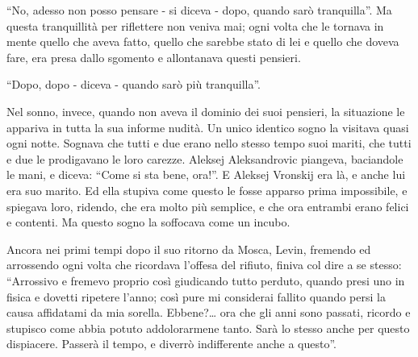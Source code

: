 ``No, adesso non posso pensare - si diceva - dopo, quando sarò tranquilla''. Ma questa tranquillità per riflettere non veniva mai; ogni volta che le tornava in mente quello che aveva fatto, quello che sarebbe stato di lei e quello che doveva fare, era presa dallo sgomento e allontanava questi pensieri. 

``Dopo, dopo - diceva - quando sarò più tranquilla''. 

Nel sonno, invece, quando non aveva il dominio dei suoi pensieri, la situazione le appariva in tutta la sua informe nudità. Un unico identico sogno la visitava quasi ogni notte. Sognava che tutti e due erano nello stesso tempo suoi mariti, che tutti e due le prodigavano le loro carezze. Aleksej Aleksandrovic piangeva, baciandole le mani, e diceva: ``Come si sta bene, ora!''. E Aleksej Vronskij era là, e anche lui era suo marito. Ed ella stupiva come questo le fosse apparso prima impossibile, e spiegava loro, ridendo, che era molto più semplice, e che ora entrambi erano felici e contenti. Ma questo sogno la soffocava come un incubo. 

Ancora nei primi tempi dopo il suo ritorno da Mosca, Levin, fremendo ed arrossendo ogni volta che ricordava l'offesa del rifiuto, finiva col dire a se stesso: ``Arrossivo e fremevo proprio così giudicando tutto perduto, quando presi uno in fisica e dovetti ripetere l'anno; così pure mi considerai fallito quando persi la causa affidatami da mia sorella. Ebbene?\ldots{} ora che gli anni sono passati, ricordo e stupisco come abbia potuto addolorarmene tanto. Sarà lo stesso anche per questo dispiacere. Passerà il tempo, e diverrò indifferente anche a questo''. 
\enlargethispage{\baselineskip}

